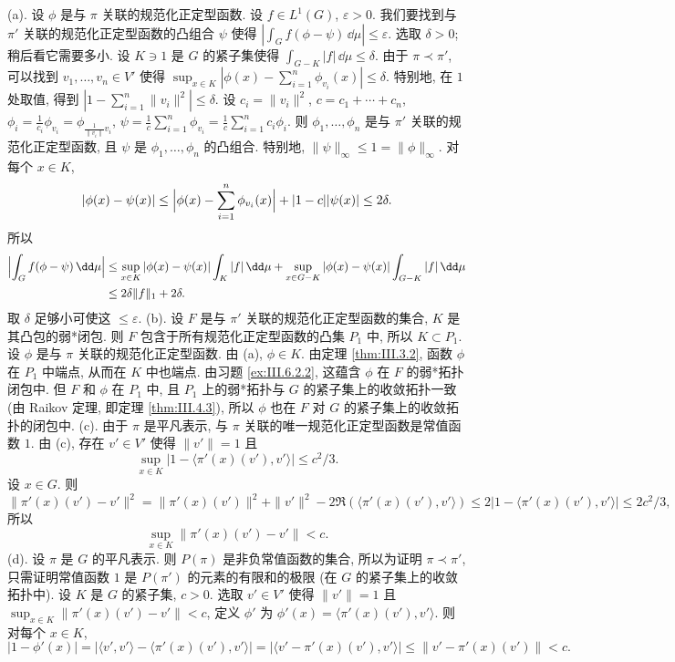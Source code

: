 \begin{solution}
(a). 设 $\phi$ 是与 $\pi$ 关联的规范化正定型函数. 设 $f \in L^1(G)$, $\varepsilon > 0$. 我们要找到与 $\pi'$ 关联的规范化正定型函数的凸组合 $\psi$ 使得 $|\int_G f(\phi - \psi)\,\dd\mu| \leq \varepsilon$. 选取 $\delta > 0$; 稍后看它需要多小. 设 $K \ni 1$ 是 $G$ 的紧子集使得 $\int_{G-K}|f|\,\dd\mu \leq \delta$. 由于 $\pi \prec \pi'$, 可以找到 $v_1, \ldots, v_n \in V'$ 使得 $\sup_{x \in K}|\phi(x) - \sum_{i=1}^n\phi_{v_i}(x)| \leq \delta$. 特别地, 在 $1$ 处取值, 得到 $|1 - \sum_{i=1}^n\|v_i\|^2| \leq \delta$. 设 $c_i = \|v_i\|^2$, $c = c_1 + \cdots + c_n$, $\phi_i = \frac{1}{c_i}\phi_{v_i} = \phi_{\frac{1}{\|v_i\|}v_i}$, $\psi = \frac{1}{c}\sum_{i=1}^n\phi_{v_i} = \frac{1}{c}\sum_{i=1}^n c_i\phi_i$. 则 $\phi_1, \ldots, \phi_n$ 是与 $\pi'$ 关联的规范化正定型函数, 且 $\psi$ 是 $\phi_1, \ldots, \phi_n$ 的凸组合. 特别地, $\|\psi\|_{\infty} \leq 1 = \|\phi\|_{\infty}$.
对每个 $x \in K$,
\[
|\phi(x) - \psi(x)| \leq \Bigl|\phi(x) - \sum_{i=1}^n\phi_{v_i}(x)\Bigr| + |1 - c||\psi(x)| \leq 2\delta.
\]
所以
\begin{align*}
\Bigl|\int_G f(\phi - \psi)\,\dd\mu\Bigr| &\leq \sup_{x \in K}|\phi(x) - \psi(x)|\int_K |f|\,\dd\mu + \sup_{x \in G-K}|\phi(x) - \psi(x)|\int_{G-K}|f|\,\dd\mu \\
&\leq 2\delta\|f\|_1 + 2\delta.
\end{align*}
取 $\delta$ 足够小可使这 $\leq \varepsilon$.
(b). 设 $F$ 是与 $\pi'$ 关联的规范化正定型函数的集合, $K$ 是其凸包的弱*闭包. 则 $F$ 包含于所有规范化正定型函数的凸集 $P_1$ 中, 所以 $K \subset P_1$. 设 $\phi$ 是与 $\pi$ 关联的规范化正定型函数. 由 (a), $\phi \in K$. 由定理 \ref{thm:III.3.2}, 函数 $\phi$ 在 $P_1$ 中端点, 从而在 $K$ 中也端点. 由习题 \ref{ex:III.6.2.2}, 这蕴含 $\phi$ 在 $F$ 的弱*拓扑闭包中. 但 $F$ 和 $\phi$ 在 $P_1$ 中, 且 $P_1$ 上的弱*拓扑与 $G$ 的紧子集上的收敛拓扑一致 (由 Raikov 定理, 即定理 \ref{thm:III.4.3}), 所以 $\phi$ 也在 $F$ 对 $G$ 的紧子集上的收敛拓扑的闭包中.
(c). 由于 $\pi$ 是平凡表示, 与 $\pi$ 关联的唯一规范化正定型函数是常值函数 $1$. 由 (c), 存在 $v' \in V'$ 使得 $\|v'\| = 1$ 且
\[
\sup_{x \in K}|1 - \langle \pi'(x)(v'), v' \rangle| \leq c^2/3.
\]
设 $x \in G$. 则
\[
\|\pi'(x)(v') - v'\|^2 = \|\pi'(x)(v')\|^2 + \|v'\|^2 - 2\Re(\langle \pi'(x)(v'), v' \rangle) \leq 2|1 - \langle \pi'(x)(v'), v' \rangle| \leq 2c^2/3,
\]
所以
\[
\sup_{x \in K}\|\pi'(x)(v') - v'\| < c.
\]
(d). 设 $\pi$ 是 $G$ 的平凡表示. 则 $P(\pi)$ 是非负常值函数的集合, 所以为证明 $\pi \prec \pi'$, 只需证明常值函数 $1$ 是 $P(\pi')$ 的元素的有限和的极限 (在 $G$ 的紧子集上的收敛拓扑中). 设 $K$ 是 $G$ 的紧子集, $c > 0$. 选取 $v' \in V'$ 使得 $\|v'\| = 1$ 且 $\sup_{x \in K}\|\pi'(x)(v') - v'\| < c$, 定义 $\phi'$ 为 $\phi'(x) = \langle \pi'(x)(v'), v' \rangle$. 则对每个 $x \in K$,
\[
|1 - \phi'(x)| = |\langle v', v' \rangle - \langle \pi'(x)(v'), v' \rangle| = |\langle v' - \pi'(x)(v'), v' \rangle| \leq \|v' - \pi'(x)(v')\| < c.
\]
\end{solution}

